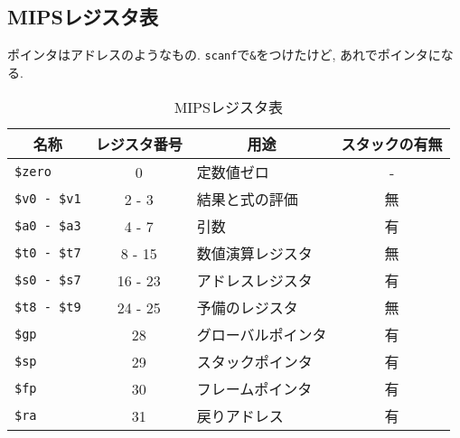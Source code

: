 \documentclass[a4paper, xelatex, ja=standard]{bxjsarticle}
\begin{document}
\clearpage
\subsection{MIPSレジスタ表}
ポインタはアドレスのようなもの. \texttt{scanf}で\texttt{\&}をつけたけど, あれでポインタになる.
\begin{table}[h]
  \centering
  \caption{MIPSレジスタ表}
  \label{}
  \begin{tabular}{|l|c|l|c|}\hline
\multicolumn{1}{|c|}{名称} & レジスタ番号  & \multicolumn{1}{c|}{用途} & スタックの有無 \\ \hline
\texttt{\$zero}      & 0       & 定数値ゼロ         & -  \\ \hline
\texttt{\$v0 - \$v1} & 2 - 3   & 結果と式の評価     & 無 \\ \hline
\texttt{\$a0 - \$a3} & 4 - 7   & 引数               & 有 \\ \hline
\texttt{\$t0 - \$t7} & 8 - 15  & 数値演算レジスタ   & 無 \\ \hline
\texttt{\$s0 - \$s7} & 16 - 23 & アドレスレジスタ   & 有 \\ \hline
\texttt{\$t8 - \$t9} & 24 - 25 & 予備のレジスタ     & 無 \\ \hline
\texttt{\$gp}        & 28      & グローバルポインタ & 有 \\ \hline
\texttt{\$sp}        & 29      & スタックポインタ   & 有 \\ \hline
\texttt{\$fp}        & 30      & フレームポインタ   & 有 \\ \hline
\texttt{\$ra}        & 31      & 戻りアドレス       & 有 \\ \hline
\end{tabular}
\end{table}
\end{document}
